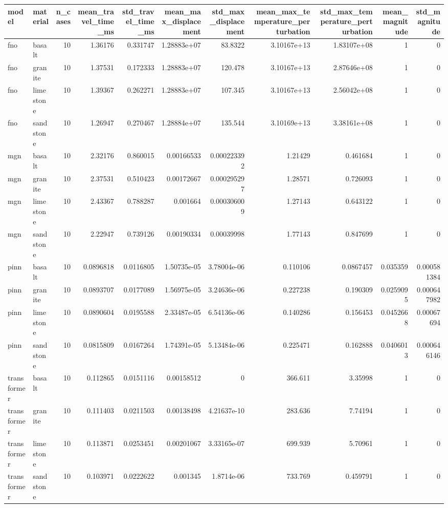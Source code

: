 \begin{tabular}{llrrrrrrrrr}
\toprule
model & material & n_cases & mean_travel_time_ms & std_travel_time_ms & mean_max_displacement & std_max_displacement & mean_max_temperature_perturbation & std_max_temperature_perturbation & mean_magnitude & std_magnitude \\
\midrule
fno & basalt & 10 & 1.36176 & 0.331747 & 1.28883e+07 & 83.8322 & 3.10167e+13 & 1.83107e+08 & 1 & 0 \\
fno & granite & 10 & 1.37531 & 0.172333 & 1.28883e+07 & 120.478 & 3.10167e+13 & 2.87646e+08 & 1 & 0 \\
fno & limestone & 10 & 1.39367 & 0.262271 & 1.28883e+07 & 107.345 & 3.10167e+13 & 2.56042e+08 & 1 & 0 \\
fno & sandstone & 10 & 1.26947 & 0.270467 & 1.28884e+07 & 135.544 & 3.10169e+13 & 3.38161e+08 & 1 & 0 \\
mgn & basalt & 10 & 2.32176 & 0.860015 & 0.00166533 & 0.000223392 & 1.21429 & 0.461684 & 1 & 0 \\
mgn & granite & 10 & 2.37531 & 0.510423 & 0.00172667 & 0.000295297 & 1.28571 & 0.726093 & 1 & 0 \\
mgn & limestone & 10 & 2.43367 & 0.788287 & 0.001664 & 0.000306009 & 1.27143 & 0.643122 & 1 & 0 \\
mgn & sandstone & 10 & 2.22947 & 0.739126 & 0.00190334 & 0.00039998 & 1.77143 & 0.847699 & 1 & 0 \\
pinn & basalt & 10 & 0.0896818 & 0.0116805 & 1.50735e-05 & 3.78004e-06 & 0.110106 & 0.0867457 & 0.035359 & 0.000581384 \\
pinn & granite & 10 & 0.0893707 & 0.0177089 & 1.56975e-05 & 3.24636e-06 & 0.227238 & 0.190309 & 0.0259095 & 0.000647982 \\
pinn & limestone & 10 & 0.0890604 & 0.0195588 & 2.33487e-05 & 6.54136e-06 & 0.140286 & 0.156453 & 0.0452668 & 0.00067694 \\
pinn & sandstone & 10 & 0.0815809 & 0.0167264 & 1.74391e-05 & 5.13484e-06 & 0.225471 & 0.162888 & 0.0406013 & 0.000646146 \\
transformer & basalt & 10 & 0.112865 & 0.0151116 & 0.00158512 & 0 & 366.611 & 3.35998 & 1 & 0 \\
transformer & granite & 10 & 0.111403 & 0.0211503 & 0.00138498 & 4.21637e-10 & 283.636 & 7.74194 & 1 & 0 \\
transformer & limestone & 10 & 0.113871 & 0.0253451 & 0.00201067 & 3.33165e-07 & 699.939 & 5.70961 & 1 & 0 \\
transformer & sandstone & 10 & 0.103971 & 0.0222622 & 0.001345 & 1.8714e-06 & 733.769 & 0.459791 & 1 & 0 \\
\bottomrule
\end{tabular}
